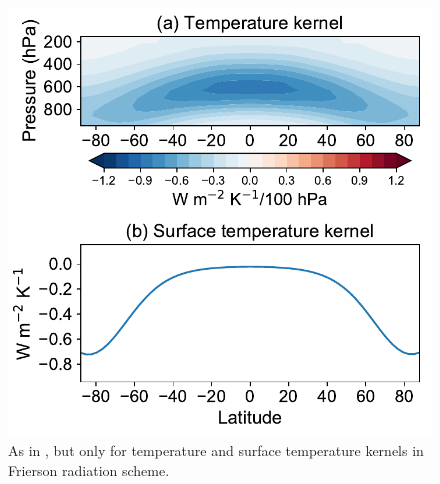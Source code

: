 \begin{figure}[ht]
	\centering
	\includegraphics[width=0.45\linewidth]{figs/polar_amp/kernels_frierson}
	\caption[Annual-mean and zonal-mean temperature and surface temperature radiative kernels for Frierson radiation scheme]{As in , but only for temperature and surface temperature kernels in Frierson radiation scheme.}
	\label{fig:frierson_kernels}
\end{figure}


